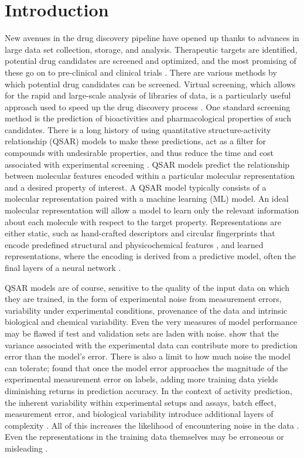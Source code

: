 \documentclass[pdflatex,sn-basic]{sn-jnl}%
\theoremstyle{thmstyleone}%
\theoremstyle{thmstyletwo}%
\theoremstyle{thmstylethree}%
\begin{document}
\section{Introduction}\label{sec1}

New avenues in the drug discovery pipeline have opened up thanks to advances in large data set collection, storage, and analysis. Therapeutic targets are identified, potential drug candidates are screened and optimized, and the most promising of these go on to pre-clinical and clinical trials \citep{Lill2007}. There are various methods by which potential drug candidates can be screened. Virtual screening, which allows for the rapid and large-scale analysis of libraries of data, is a particularly useful approach used to speed up the drug discovery process \citep{Neves2018}. One standard screening method is the prediction of bioactivities and pharmacological properties of such candidates. There is a long history of using quantitative structure-activity relationship (QSAR) models to make these predictions, act as a filter for compounds with undesirable properties, and thus reduce the time and cost associated with experimental screening \citep{Sabando2021}. QSAR models predict the relationship between molecular features encoded within a particular molecular representation and a desired property \citep{Sabando2021} of interest. A QSAR model typically consists of a molecular representation paired with a machine learning (ML) model. An ideal molecular representation will allow a model to learn only the relevant information about each molecule with respect to the target property. Representations are either static, such as hand-crafted descriptors and circular fingerprints that encode predefined structural and physicochemical features \citep{Rogers2010, David2020, sns}, and learned representations, where the encoding is derived from a predictive model, often the final layers of a neural network \citep{Sabando2021, kishimoto2023}. 


QSAR models are of course, sensitive to the quality of the input data on which they are trained, in the form of experimental noise from measurement errors, variability under experimental conditions, provenance of the data and intrinsic biological and chemical variability. Even the very measures of model performance may be flawed if test and validation sets are laden with noise. \citet{Kolmar2021} show that the variance associated with the experimental data can contribute more to prediction error than the model’s error. There is also a limit to how much noise the model can tolerate; \citet{jorner2021} found that once the model error approaches the magnitude of the experimental measurement error on labels, adding more training data yields diminishing returns in prediction accuracy. In the context of activity prediction, the inherent variability within experimental setups and assays, batch effect, measurement error, and biological variability introduce additional layers of complexity \citep{Kolmar2021, Fourches2010}. All of this increases the likelihood of encountering noise in the data \citep{Fang2022}. Even the representations in the training data themselves may be erroneous or misleading \citep{Walters2023}. 
\end{document}
